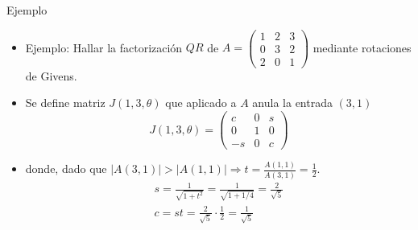 \documentclass{beamer}
\begin{document}
  \begin{frame}{Ejemplo}
    \begin{itemize}
      \item Ejemplo: Hallar la factorizaci\'on $QR$ de $A=\left(\begin{array}{ccc}
      1 & 2 & 3\\
      0 & 3 & 2\\
      2 & 0 & 1
     \end{array}\right)$ mediante rotaciones de Givens.

      \item<2->Se define matriz $J(1,3,\theta)$ que aplicado a $A$ anula la entrada $(3,1)$ 
$$
J(1,3,\theta) = \left(\begin{array}{ccc}
                  c & 0 & s\\
                  0 & 1 & 0\\
                  -s & 0 & c
                \end{array}\right)
$$
\item<3->donde, dado que $|A(3,1)|>|A(1,1)| \Rightarrow t=\frac{A(1,1)}{A(3,1)}=\frac{1}{2}$.
\begin{eqnarray}
\nonumber s=\frac{1}{\sqrt{1+t^2}}=\frac{1}{\sqrt{1+1/4}}=\frac{2}{\sqrt{5}}\\
\nonumber c=st=\frac{2}{\sqrt{5}}\cdot\frac{1}{2}=\frac{1}{\sqrt{5}}
\end{eqnarray}
 \end{itemize}
\end{frame}
\end{document}
